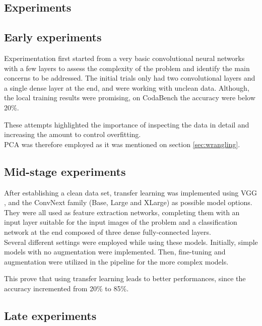 \documentclass[10pt]{article}
\begin{document}
\begin{multicols}{2}
    \section{Experiments}
        \subsection{Early experiments}
		Experimentation first started from a very basic convolutional neural networks with a few layers to assess the complexity of the problem and identify the main concerns to be addressed. The initial trials only had two convolutional layers and a single dense layer at the end, and were working with unclean data. 
        Although, the local training results were promising, on CodaBench the accuracy were below 20\%.
        
        These attempts highlighted the importance of inspecting the data in detail and increasing the amount to control overfitting. \\  
        PCA was therefore employed as it was mentioned on section \ref{sec:wrangling}.

        
        \subsection{Mid-stage experiments}

        After establishing a clean data set, transfer learning was implemented using VGG \cite{simonyan2014very}, and the ConvNext family (Base, Large and XLarge) \cite{liu2022convnet} as possible model options. 
        They were all used as feature extraction networks, completing them with an input layer suitable for the input images of the problem and a classification network at the end composed of three dense fully-connected layers. \\
        Several different settings were employed while using these models. Initially, simple models with no augmentation were implemented. Then, fine-tuning and augmentation were utilized in the pipeline for the more complex models. 

        This prove that using transfer learning leads to better performances, since the accuracy incremented from 20\% to 85\%.
        
        \subsection{Late experiments}


\end{multicols}
\end{document}
